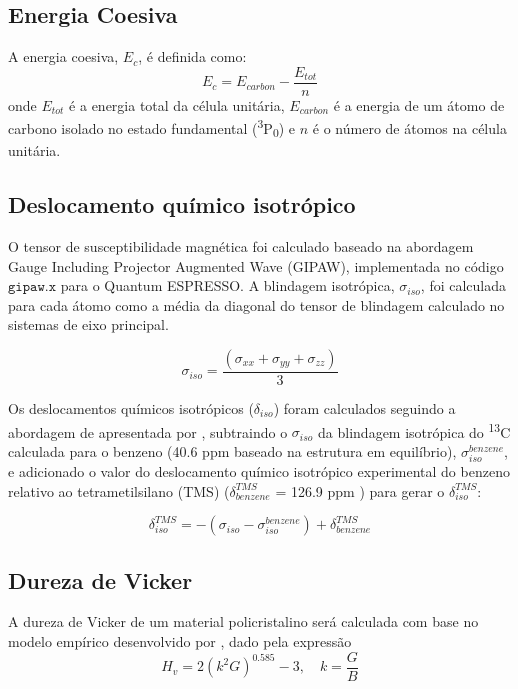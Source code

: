 	\subsection{Energia Coesiva}
		A energia coesiva, $E_c$, é definida como:
		\begin{equation}
			\label{Ec}
			E_c = E_{carbon}  - \frac{E_{tot}}{n}
		\end{equation}
		onde $E_{tot}$ é a energia total da célula unitária, $E_{carbon}$ é a energia de um átomo de carbono isolado no estado fundamental (\textsuperscript{3}P\textsubscript{0}) e $n$ é o número de átomos na célula unitária.
		
	\subsection{Deslocamento químico isotrópico}
		
		O tensor de susceptibilidade magnética foi calculado baseado na abordagem Gauge Including Projector Augmented Wave (GIPAW), implementada no código $\mathtt{gipaw.x}$ \cite{varini2013enhancement} para o Quantum ESPRESSO. A blindagem isotrópica, $\sigma_{iso}$, foi calculada para cada átomo como a média da diagonal do tensor de blindagem calculado no sistemas de eixo principal. 

		\begin{equation}
			\label{rmn}
			\sigma_{iso} = \frac{(\sigma_{xx} + \sigma_{yy} + \sigma_{zz})}{3}
		\end{equation}
		
		Os deslocamentos químicos isotrópicos ($\delta_{iso}$) foram calculados seguindo a abordagem de apresentada por \citeauthor{marques2006magnetic}, subtraindo o $\sigma_{iso}$ da blindagem isotrópica do \textsuperscript{13}C calculada para o benzeno (40.6 ppm baseado na estrutura em equilíbrio), $\sigma_{iso}^{benzene}$, e adicionado o valor do deslocamento químico isotrópico experimental do benzeno relativo ao tetrametilsilano (TMS) ($\delta^{TMS}_{benzene}$ = 126.9 ppm \cite{jameson1987gas}) para gerar o $\delta^{TMS}_{iso}$: 
		
		\begin{equation}
		\label{rmn2}
		\delta^{TMS}_{iso} = -(\sigma_{iso} - \sigma^{benzene}_{iso}) + \delta^{TMS}_{benzene}
		\end{equation}	
	
	\subsection{Dureza de Vicker}
		A dureza de Vicker de um material policristalino será calculada com base no modelo empírico desenvolvido por \citeauthor{chen2011modeling}, dado pela expressão 
		\begin{equation}
			\label{hv}
			H_v = 2(k^2G)^{0.585} - 3, \quad k = \frac{G}{B}
		\end{equation}
		
